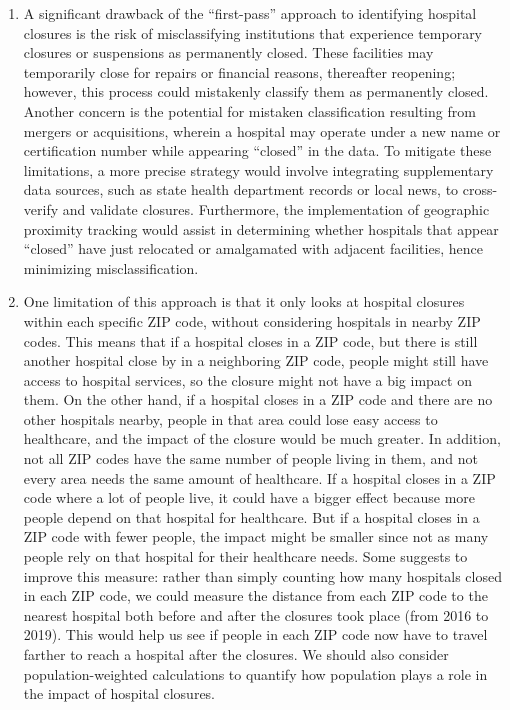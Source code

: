 \documentclass[
  letterpaper,
  DIV=11,
  numbers=noendperiod]{scrartcl}
\providecommand{\tightlist}{%
  \setlength{\itemsep}{0pt}\setlength{\parskip}{0pt}}\usepackage{longtable,booktabs,array}
\begin{document}
\begin{enumerate}
\def\labelenumi{\arabic{enumi}.}
\tightlist
\item
  A significant drawback of the ``first-pass'' approach to identifying
  hospital closures is the risk of misclassifying institutions that
  experience temporary closures or suspensions as permanently closed.
  These facilities may temporarily close for repairs or financial
  reasons, thereafter reopening; however, this process could mistakenly
  classify them as permanently closed. Another concern is the potential
  for mistaken classification resulting from mergers or acquisitions,
  wherein a hospital may operate under a new name or certification
  number while appearing ``closed'' in the data. To mitigate these
  limitations, a more precise strategy would involve integrating
  supplementary data sources, such as state health department records or
  local news, to cross-verify and validate closures. Furthermore, the
  implementation of geographic proximity tracking would assist in
  determining whether hospitals that appear ``closed'' have just
  relocated or amalgamated with adjacent facilities, hence minimizing
  misclassification.
\item
  One limitation of this approach is that it only looks at hospital
  closures within each specific ZIP code, without considering hospitals
  in nearby ZIP codes. This means that if a hospital closes in a ZIP
  code, but there is still another hospital close by in a neighboring
  ZIP code, people might still have access to hospital services, so the
  closure might not have a big impact on them. On the other hand, if a
  hospital closes in a ZIP code and there are no other hospitals nearby,
  people in that area could lose easy access to healthcare, and the
  impact of the closure would be much greater. In addition, not all ZIP
  codes have the same number of people living in them, and not every
  area needs the same amount of healthcare. If a hospital closes in a
  ZIP code where a lot of people live, it could have a bigger effect
  because more people depend on that hospital for healthcare. But if a
  hospital closes in a ZIP code with fewer people, the impact might be
  smaller since not as many people rely on that hospital for their
  healthcare needs. Some suggests to improve this measure: rather than
  simply counting how many hospitals closed in each ZIP code, we could
  measure the distance from each ZIP code to the nearest hospital both
  before and after the closures took place (from 2016 to 2019). This
  would help us see if people in each ZIP code now have to travel
  farther to reach a hospital after the closures. We should also
  consider population-weighted calculations to quantify how population
  plays a role in the impact of hospital closures.
\end{enumerate}
\end{document}
